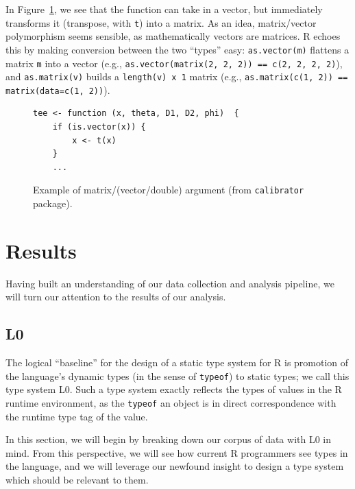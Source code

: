 \documentclass[acmsmall,10pt,review,anonymous]{acmart}\settopmatter{printfolios=true,printccs=false,printacmref=false}
\newcommand{\code}[1]{\lstinline|#1|\xspace}
\begin{document}
In Figure~\ref{fig:matvec}, we see that the function can take in a vector, but immediately transforms it (transpose, with {\tt t}) into a matrix.
As an idea, matrix/vector polymorphism seems sensible, as mathematically vectors are matrices.
R echoes this by making conversion between the two ``types'' easy:
\code{as.vector(m)} flattens a matrix \code{m} into a vector (e.g., \code{as.vector(matrix(2, 2, 2)) == c(2, 2, 2, 2)}), and \code{as.matrix(v)} builds a {\tt length(v) x 1} matrix (e.g., \code{as.matrix(c(1, 2)) == matrix(data=c(1, 2))}).

\begin{figure}[!hb]{\small\begin{lstlisting}[style=R]
tee <- function (x, theta, D1, D2, phi)  {
    if (is.vector(x)) {
        x <- t(x)
    }
    ...
\end{lstlisting}}\caption{Example of matrix/(vector/double) argument (from {\tt calibrator} package).}\label{fig:matvec}\end{figure}

%
%
%
%
%
%
\section{Results}\label{sec:results}

Having built an understanding of our data collection and analysis pipeline, we will turn our attention to the results of our analysis.  


%
%
%
%
\subsection{L0}

The logical ``baseline'' for the design of a static type system for R is promotion of the language's dynamic types (in the sense of \code{typeof}) to static types; we call this type system L0.
Such a type system exactly reflects the types of values in the R runtime environment, as the \code{typeof} an object is in direct correspondence with the runtime type tag of the value.

In this section, we will begin by breaking down our corpus of data with L0 in mind.
From this perspective, we will see how current R programmers see types in the language, and we will leverage our newfound insight to design a type system which should be relevant to them.
\end{document}
